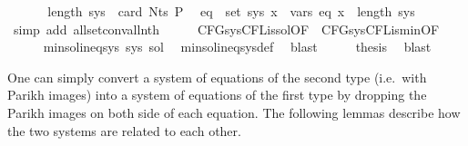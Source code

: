 \begin{isabellebody}
\ \ \isamarkupfalse%
\ \isamarkupfalse%
\ {\isacharasterisk}{\kern0pt}\ {\isacartoucheopen}length\ sys\ {\isacharequal}{\kern0pt}\ card\ {\isacharparenleft}{\kern0pt}Nts\ P{\isacharparenright}{\kern0pt}{\isacartoucheclose}\ \isamarkupfalse%
\ {\isachardoublequoteopen}{\isasymforall}eq\ {\isasymin}\ set\ sys{\isachardot}{\kern0pt}\ {\isasymforall}x\ {\isasymin}\ vars\ eq{\isachardot}{\kern0pt}\ x\ {\isacharless}{\kern0pt}\ length\ sys{\isachardoublequoteclose}\isanewline
\ \ \ \ \isamarkupfalse%
\ {\isacharparenleft}{\kern0pt}simp\ add{\isacharcolon}{\kern0pt}\ all{\isacharunderscore}{\kern0pt}set{\isacharunderscore}{\kern0pt}conv{\isacharunderscore}{\kern0pt}all{\isacharunderscore}{\kern0pt}nth{\isacharparenright}{\kern0pt}\isanewline
\ \ \isamarkupfalse%
\ \isamarkupfalse%
\ CFG{\isacharunderscore}{\kern0pt}sys{\isacharunderscore}{\kern0pt}CFL{\isacharunderscore}{\kern0pt}is{\isacharunderscore}{\kern0pt}sol{\isacharbrackleft}{\kern0pt}OF\ {\isacharasterisk}{\kern0pt}{\isacharbrackright}{\kern0pt}\ CFG{\isacharunderscore}{\kern0pt}sys{\isacharunderscore}{\kern0pt}CFL{\isacharunderscore}{\kern0pt}is{\isacharunderscore}{\kern0pt}min{\isacharbrackleft}{\kern0pt}OF\ {\isacharasterisk}{\kern0pt}{\isacharbrackright}{\kern0pt}\isanewline
\ \ \ \ \isamarkupfalse%
\ {\isachardoublequoteopen}min{\isacharunderscore}{\kern0pt}sol{\isacharunderscore}{\kern0pt}ineq{\isacharunderscore}{\kern0pt}sys\ sys\ sol{\isachardoublequoteclose}\ \isamarkupfalse%
\ min{\isacharunderscore}{\kern0pt}sol{\isacharunderscore}{\kern0pt}ineq{\isacharunderscore}{\kern0pt}sys{\isacharunderscore}{\kern0pt}def\ \isamarkupfalse%
\ blast\isanewline
\ \ \isamarkupfalse%
\ \isamarkupfalse%
\ {\isacharquery}{\kern0pt}thesis\ \isamarkupfalse%
\ blast\isanewline
{}\isamarkupfalse%
%
\endisatagproof
{\isafoldproof}%
%
\isadelimproof
\isanewline
%
\endisadelimproof
\isanewline
{}\isamarkupfalse%
%
\isadelimdocument
%
\endisadelimdocument
%
\isatagdocument
%
\isamarkuptrue%
%
\endisatagdocument
{\isafolddocument}%
%
\isadelimdocument
%
\endisadelimdocument
%
\begin{isamarkuptext}%
One can simply convert a system  of equations of the second type (i.e.\ with Parikh
images) into a system of equations of the first type by dropping the Parikh images on both side of
each equation. The following lemmas describe how the two systems are related to each other.


\end{isamarkuptext}
\end{isabellebody}
